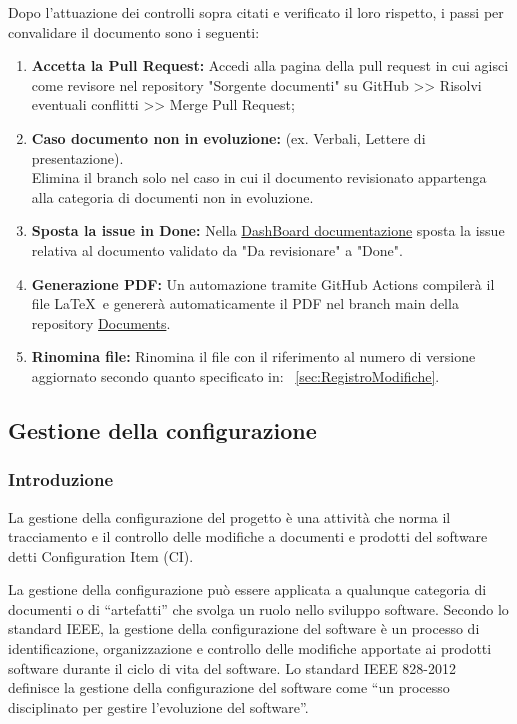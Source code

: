 \documentclass{article}
\begin{document}
Dopo l'attuazione dei controlli sopra citati e verificato il loro rispetto, i passi per convalidare il documento sono i seguenti:
\begin{enumerate}
 \item \textbf{Accetta la Pull Request:} Accedi alla pagina della pull request in cui agisci come revisore nel repository "Sorgente documenti" su GitHub >> Risolvi eventuali conflitti >> Merge Pull Request;
    \item \textbf{Caso documento non in evoluzione: }(ex. Verbali, Lettere di presentazione).\\
    Elimina il branch solo nel caso in cui il documento revisionato appartenga alla categoria di documenti non in evoluzione.
     \item \textbf{Sposta la issue in Done:} Nella \href{https://github.com/orgs/ByteOps-swe/projects/1/views/1}{DashBoard documentazione} sposta la issue relativa al documento validato da "Da revisionare" a "Done".
     \item \textbf{Generazione PDF:} Un automazione tramite GitHub Actions compilerà il file   \LaTeX\ e genererà automaticamente il PDF nel branch main della repository \href{https://github.com/ByteOps-swe/Documents}{Documents}. 
     \item \textbf{Rinomina file: }Rinomina il file con il riferimento al numero di versione aggiornato secondo quanto specificato in: ~\ref{sec:RegistroModifiche}.
     
     
\end{enumerate}
\subsection{Gestione della configurazione}
\subsubsection{Introduzione}
La gestione della configurazione del progetto è una attività che norma il tracciamento e il controllo delle modifiche a documenti e prodotti del software detti Configuration Item (CI).

La gestione della configurazione può essere applicata a qualunque categoria di documenti o di “artefatti” che svolga un ruolo nello sviluppo software.
Secondo lo standard IEEE, la gestione della configurazione del software è un processo di identificazione, organizzazione e controllo delle modifiche apportate ai prodotti software durante il ciclo di vita del software.
 Lo standard IEEE 828-2012 definisce la gestione della configurazione del software come “un processo disciplinato per gestire l’evoluzione del software”. 
\end{document}
